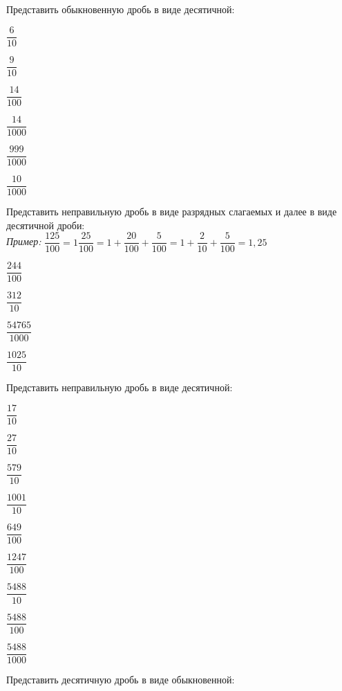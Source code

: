 \begin{class}[type=class, number=1]
	\begin{listofex}
		\item Представить обыкновенную дробь в виде десятичной:
		\begin{enumcols}[itemcolumns=6]
			\item \( \dfrac{6}{10} \)
			\item \( \dfrac{9}{10} \)
			\item \( \dfrac{14}{100} \)
			\item \( \dfrac{14}{1000} \)
			\item \( \dfrac{999}{1000} \)
			\item \( \dfrac{10}{1000} \)
		\end{enumcols}
		\item Представить неправильную дробь в виде разрядных слагаемых и далее в виде десятичной дроби:\\
		\textit{Пример:} \( \dfrac{125}{100}=1\dfrac{25}{100}=1+\dfrac{20}{100}+\dfrac{5}{100}=1+\dfrac{2}{10}+\dfrac{5}{100}=1,25 \)\\
		\begin{enumcols}[itemcolumns=4]
			\item \( \dfrac{244}{100} \)
			\item \( \dfrac{312}{10} \)
			\item \( \dfrac{54765}{1000} \)
			\item \( \dfrac{1025}{10} \)
		\end{enumcols}
		\item Представить неправильную дробь в виде десятичной:
		\begin{enumcols}[itemcolumns=5]
			\item \( \dfrac{17}{10} \)
			\item \( \dfrac{27}{10} \)
			\item \( \dfrac{579}{10} \)
			\item \( \dfrac{1001}{10} \)
			\item \( \dfrac{649}{100} \)
			\item \( \dfrac{1247}{100} \)
			\item \( \dfrac{5488}{10} \)
			\item \( \dfrac{5488}{100} \)
			\item \( \dfrac{5488}{1000} \)
		\end{enumcols}
		\item Представить десятичную дробь в виде обыкновенной:

\end{listofex}
\end{class}
